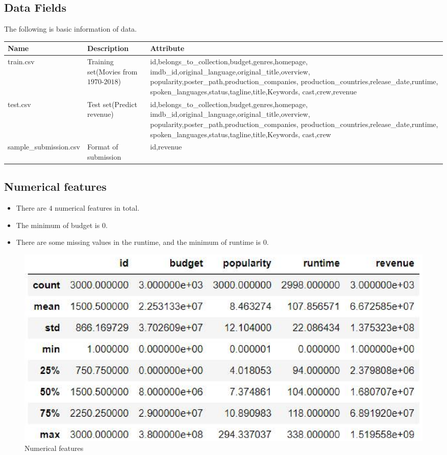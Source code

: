 \subsection{Data Fields}  
The following is basic information of data. \\
\begin{tabular}{p{3cm}p{2cm}p{7cm}}
  \toprule
  \centering
  Name
  & Description & Attribute \\
  \midrule
  \centering 
  train.csv
  & {Training set(Movies from $1970$-$2018$)} &  {id,belongs\_to\_collection,budget,genres,homepage,
  imdb\_id,original\_language,original\_title,overview,
  popularity,poster\_path,production\_companies,
  production\_countries,release\_date,runtime,
  spoken\_languages,status,tagline,title,Keywords,
  cast,crew,revenue}  \\
  \centering 
  test.csv
  & {Test set(Predict revenue)} &  {id,belongs\_to\_collection,budget,genres,homepage,
  imdb\_id,original\_language,original\_title,overview,
  popularity,poster\_path,production\_companies,
  production\_countries,release\_date,runtime,
  spoken\_languages,status,tagline,title,Keywords,
  cast,crew} \\
  \centering
  sample\_submission.csv &  {Format of submission} &  {id,revenue} \\
  \bottomrule
  \end{tabular}
  \subsection{Numerical features} 
  \begin{itemize}
    \item  There are $4$ numerical features in total.
    \smallskip
    \item  The minimum of budget is $0$.
    \smallskip
    \item There are some missing values in the runtime,
     and the minimum of runtime is $0$.
  \end{itemize}

  \begin{figure}[htbp]
    \includegraphics[scale=0.5]{./figures/describe.eps}
    \caption{Numerical features}
  \end{figure}


